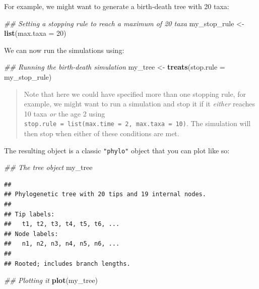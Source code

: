 \documentclass[
]{book}
\newenvironment{Shaded}{\begin{snugshade}}{\end{snugshade}}
\newcommand{\CommentTok}[1]{\textcolor[rgb]{0.56,0.35,0.01}{\textit{#1}}}
\newcommand{\DataTypeTok}[1]{\textcolor[rgb]{0.13,0.29,0.53}{#1}}
\newcommand{\DecValTok}[1]{\textcolor[rgb]{0.00,0.00,0.81}{#1}}
\newcommand{\KeywordTok}[1]{\textcolor[rgb]{0.13,0.29,0.53}{\textbf{#1}}}
\newcommand{\NormalTok}[1]{#1}
\newcommand{\StringTok}[1]{\textcolor[rgb]{0.31,0.60,0.02}{#1}}
\begin{document}
For example, we might want to generate a birth-death tree with 20 taxa:

\begin{Shaded}
\begin{Highlighting}[]
\CommentTok{\#\# Setting a stopping rule to reach a maximum of 20 taxa}
\NormalTok{my\_stop\_rule \textless{}{-}}\StringTok{ }\KeywordTok{list}\NormalTok{(}\DataTypeTok{max.taxa =} \DecValTok{20}\NormalTok{)}
\end{Highlighting}
\end{Shaded}

We can now run the simulations using:

\begin{Shaded}
\begin{Highlighting}[]
\CommentTok{\#\# Running the birth{-}death simulation}
\NormalTok{my\_tree \textless{}{-}}\StringTok{ }\KeywordTok{treats}\NormalTok{(}\DataTypeTok{stop.rule =}\NormalTok{ my\_stop\_rule)}
\end{Highlighting}
\end{Shaded}

\begin{quote}
Note that here we could have specified more than one stopping rule, for example, we might want to run a simulation and stop it if it \emph{either} reaches 10 taxa \emph{or} the age 2 using \texttt{stop.rule\ =\ list(max.time\ =\ 2,\ max.taxa\ =\ 10)}. The simulation will then stop when either of these conditions are met.
\end{quote}

The resulting object is a classic \texttt{"phylo"} object that you can plot like so:

\begin{Shaded}
\begin{Highlighting}[]
\CommentTok{\#\# The tree object}
\NormalTok{my\_tree}
\end{Highlighting}
\end{Shaded}

\begin{verbatim}
## 
## Phylogenetic tree with 20 tips and 19 internal nodes.
## 
## Tip labels:
##   t1, t2, t3, t4, t5, t6, ...
## Node labels:
##   n1, n2, n3, n4, n5, n6, ...
## 
## Rooted; includes branch lengths.
\end{verbatim}

\begin{Shaded}
\begin{Highlighting}[]
\CommentTok{\#\# Plotting it}
\KeywordTok{plot}\NormalTok{(my\_tree)}
\end{Highlighting}
\end{Shaded}
\end{document}
